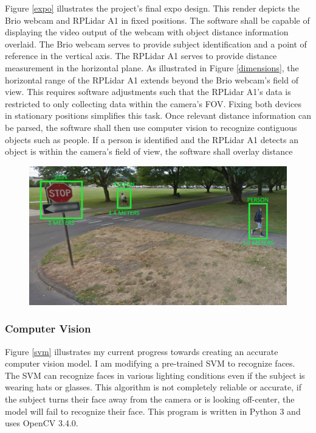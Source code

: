 \documentclass[onecolumn, draftclsnofoot,10pt, compsoc]{IEEEtran}
\begin{document}
\begin{singlespace}
			Figure \ref{expo} illustrates the project's final expo design.
			This render depicts the Brio webcam and RPLidar A1 in fixed positions.
			The software shall be capable of displaying the video output of the webcam with object distance information overlaid.
			The Brio webcam serves to provide subject identification and a point of reference in the vertical axis.
			The RPLidar A1 serves to provide distance measurement in the horizontal plane.
			As illustrated in Figure \ref{dimensions}, the horizontal range of the RPLidar A1 extends beyond the Brio webcam's field of view.
			This requires software adjustments such that the RPLidar A1's data is restricted to only collecting data within the camera's FOV.
			Fixing both devices in stationary positions simplifies this task.
			Once relevant distance information can be parsed, the software shall then use computer vision to recognize contiguous objects such as people.
			If a person is identified and the RPLidar A1 detects an object is within the camera's field of view, the software shall overlay distance 

			\begin{figure}[here]
				\includegraphics[scale=0.5, width=\textwidth]{overlay_design.png}
				\label{overlay}
			\end{figure}

		\subsubsection{Computer Vision}
			Figure \ref{svm} illustrates my current progress towards creating an accurate computer vision model.
			I am modifying a pre-trained SVM to recognize faces.
			The SVM can recognize faces in various lighting conditions even if the subject is wearing hats or glasses.
			This algorithm is not completely reliable or accurate, if the subject turns their face away from the camera or is looking off-center, the model will fail to recognize their face.
			This program is written in Python 3 and uses OpenCV 3.4.0. \cite{opencv}


\end{singlespace}
\end{document}
